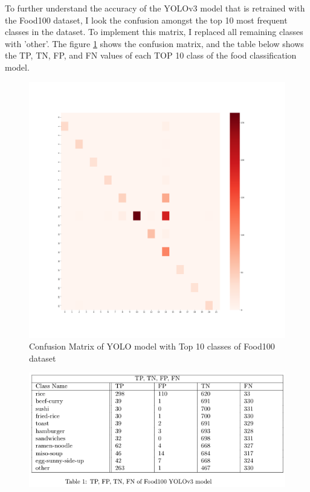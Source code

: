 \documentclass{article}
\begin{document}
To further understand the accuracy of the YOLOv3 model that is retrained with the Food100 dataset, I look the confusion amongst the top 10 most frequent classes in the dataset. To implement this matrix, I replaced all remaining classes with 'other'. The figure \ref{fig:cm_food100_top10_classes} shows the confusion matrix, and the table below shows the TP, TN, FP, and FN values of each TOP 10 class of the food classification model.

\begin{figure}[H]
    \centering
    \includegraphics[scale=0.2]{imgs/confusionMatrix_food_modified.png}
    \caption{Confusion Matrix of YOLO model with Top 10 classes of Food100 dataset}
    \label{fig:cm_food100_top10_classes}
\end{figure}

\begin{figure}[H]
    \centering
    \includegraphics[scale=0.5]{imgs/Food100_table.png}
    \label{fig:food100_table}
\end{figure}
\end{document}
